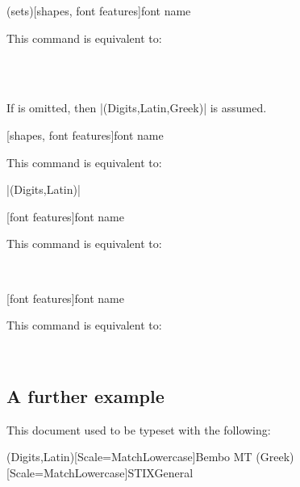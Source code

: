 \documentclass{ltxdockit}
\begin{document}
\begin{ltxsyntax}

(sets)[shapes, font features]{font name}

This command is equivalent to:

\\
\\

If  is omitted, then |(Digits,Latin,Greek)| is assumed.

[shapes, font features]{font name}

This command is equivalent to:

|(Digits,Latin)|

[font features]{font name}

This command is equivalent to:

\\

[font features]{font name}

This command is equivalent to:

\\

\end{ltxsyntax}

\subsection{A further example}

This document used to be typeset with the following:

\begin{example}
\setmainfont[Numbers=OldStyle]{Sabon LT Std}
\setmathsfont(Digits,Latin)[Scale=MatchLowercase]{Bembo MT}
\setmathsfont(Greek)[Scale=MatchLowercase]{STIXGeneral}
\setminwhitespace[750]
\end{example}
\end{document}
